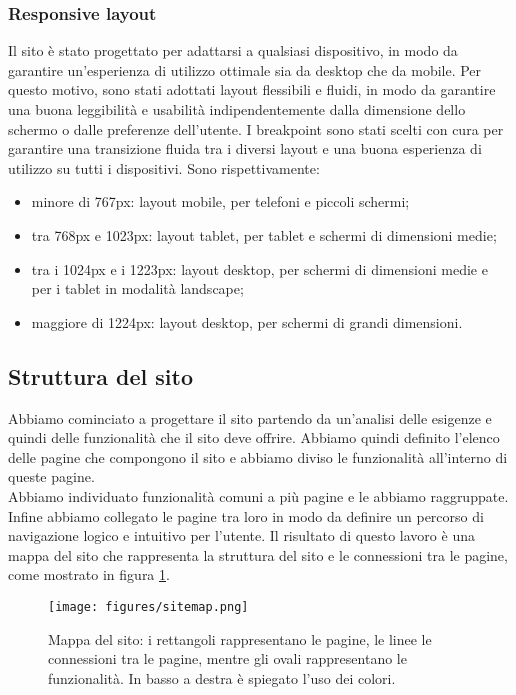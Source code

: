 \subsubsection{Responsive layout}

Il sito è stato progettato per adattarsi a qualsiasi dispositivo, in modo da
garantire un'esperienza di utilizzo ottimale sia da desktop che da mobile. Per
questo motivo, sono stati adottati layout flessibili e fluidi, in modo da
garantire una buona leggibilità e usabilità indipendentemente dalla dimensione
dello schermo o dalle preferenze dell'utente. I breakpoint sono stati scelti
con cura per garantire una transizione fluida tra i diversi layout e una
buona esperienza di utilizzo su tutti i dispositivi. Sono rispettivamente:
\begin{itemize}
	\item minore di 767px: layout mobile, per telefoni e piccoli schermi;

	\item tra 768px e 1023px: layout tablet, per tablet e schermi di dimensioni
	      medie;

	\item tra i 1024px e i 1223px: layout desktop, per schermi di dimensioni
	      medie e per i tablet in modalità landscape;

	\item maggiore di 1224px: layout desktop, per schermi di grandi dimensioni.
\end{itemize}

\subsection{Struttura del sito}

Abbiamo cominciato a progettare il sito partendo da un'analisi delle esigenze e
quindi delle funzionalità che il sito deve offrire. Abbiamo quindi definito
l'elenco delle pagine che compongono il sito e abbiamo diviso le funzionalità
all'interno di queste pagine.\\
Abbiamo individuato funzionalità comuni a più pagine e le abbiamo raggruppate.
Infine abbiamo collegato le pagine tra loro in modo da definire un percorso
di navigazione logico e intuitivo per l'utente. Il risultato di questo lavoro
è una mappa del sito che rappresenta la struttura del sito e le connessioni tra
le pagine, come mostrato in figura \ref{fig:sitemap}.\\

\begin{figure}[h]
	\label{fig:sitemap}
	\centering
	\texttt{[image: figures/sitemap.png]}
	\caption{Mappa del sito: i rettangoli rappresentano le pagine, le linee
		le connessioni tra le pagine, mentre gli ovali rappresentano le
		funzionalità. In basso a destra è spiegato l'uso dei colori.}
\end{figure}

